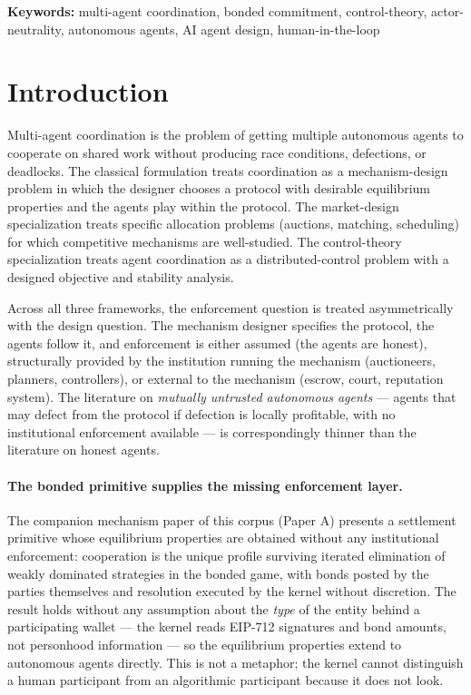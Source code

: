 \documentclass[11pt,a4paper]{article}
\theoremstyle{definition}
\theoremstyle{remark}
\begin{document}
\medskip
\noindent\textbf{Keywords:}
multi-agent coordination, bonded commitment, control-theory,
actor-neutrality, autonomous agents, AI agent design,
human-in-the-loop

\section{Introduction}
\label{sec:intro}

Multi-agent coordination is the problem of getting multiple
autonomous agents to cooperate on shared work without producing
race conditions, defections, or deadlocks. The classical formulation
\citep{shoham_leyton_brown_2009, parkes_seuken_2024} treats
coordination as a mechanism-design problem in which the designer
chooses a protocol with desirable equilibrium properties and the
agents play within the protocol. The market-design specialization
\citep{milgrom_2017} treats specific allocation problems (auctions,
matching, scheduling) for which competitive mechanisms are
well-studied. The control-theory specialization
\citep{khalil_2002, bertsekas_2005} treats agent coordination as a
distributed-control problem with a designed objective and stability
analysis.

Across all three frameworks, the enforcement question is treated
asymmetrically with the design question. The mechanism designer
specifies the protocol, the agents follow it, and enforcement is
either assumed (the agents are honest), structurally provided by
the institution running the mechanism (auctioneers, planners,
controllers), or external to the mechanism (escrow, court,
reputation system). The literature on \emph{mutually untrusted
autonomous agents} --- agents that may defect from the protocol if
defection is locally profitable, with no institutional enforcement
available --- is correspondingly thinner than the literature on
honest agents.

\paragraph{The bonded primitive supplies the missing enforcement layer.}
The companion mechanism paper of this corpus (Paper A) presents a
settlement primitive whose equilibrium properties are obtained
without any institutional enforcement: cooperation is the unique
profile surviving iterated elimination of weakly dominated
strategies in the bonded game, with bonds posted by the parties
themselves and resolution executed by the kernel without
discretion. The result holds without any assumption about the
\emph{type} of the entity behind a participating wallet --- the
kernel reads EIP-712 signatures and bond amounts, not personhood
information --- so the equilibrium properties extend to autonomous
agents directly. This is not a metaphor; the kernel cannot
distinguish a human participant from an algorithmic participant
because it does not look.
\end{document}
